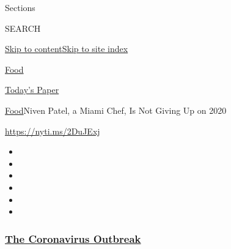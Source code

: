 Sections

SEARCH

\protect\hyperlink{site-content}{Skip to
content}\protect\hyperlink{site-index}{Skip to site index}

\href{https://www.nytimes3xbfgragh.onion/section/food}{Food}

\href{https://myaccount.nytimes3xbfgragh.onion/auth/login?response_type=cookie\&client_id=vi}{}

\href{https://www.nytimes3xbfgragh.onion/section/todayspaper}{Today's
Paper}

\href{/section/food}{Food}\textbar{}Niven Patel, a Miami Chef, Is Not
Giving Up on 2020

\url{https://nyti.ms/2DuJExj}

\begin{itemize}
\item
\item
\item
\item
\item
\item
\end{itemize}

\hypertarget{the-coronavirus-outbreak}{%
\subsubsection{\texorpdfstring{\href{https://www.nytimes3xbfgragh.onion/news-event/coronavirus?name=styln-coronavirus-national\&region=TOP_BANNER\&variant=undefined\&block=storyline_menu_recirc\&action=click\&pgtype=Article\&impression_id=bcdbc460-e38b-11ea-ab31-cfe12db18fb4}{The
Coronavirus
Outbreak}}{The Coronavirus Outbreak}}\label{the-coronavirus-outbreak}}

